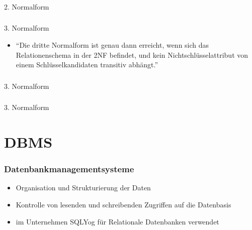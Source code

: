 \documentclass[aspectratio=169,14pt,xcolor=dvipsnames]{beamer}
\begin{document}
\begin{frame}[t]
    \frametitle{\subsecname}
    \framesubtitle{\subsubsecname}
    2. Normalform
    
\end{frame}

\begin{frame}[t]
    \frametitle{\subsecname}
    \framesubtitle{\subsubsecname}
    3. Normalform
    \begin{itemize}
        \item "`Die dritte Normalform ist genau dann erreicht, wenn sich das Relationenschema in der 2NF befindet, und kein Nichtschlüsselattribut von einem Schlüsselkandidaten transitiv abhängt."'
    \end{itemize}
\end{frame}

\begin{frame}[t]
    \frametitle{\subsecname}
    \framesubtitle{\subsubsecname}
    3. Normalform
    
\end{frame}

\begin{frame}[t]
    \frametitle{\subsecname}
    \framesubtitle{\subsubsecname}
    3. Normalform
    
\end{frame}

\section{DBMS}
\begin{frame}[t]
    \frametitle{Datenbankmanagementsysteme}
    \begin{itemize}
        \item Organisation und Strukturierung der Daten
        \item Kontrolle von lesenden und schreibenden Zugriffen auf die Datenbasis
        \item im Unternehmen SQLYog für Relationale Datenbanken verwendet
    \end{itemize}
\end{frame}
\end{document}
